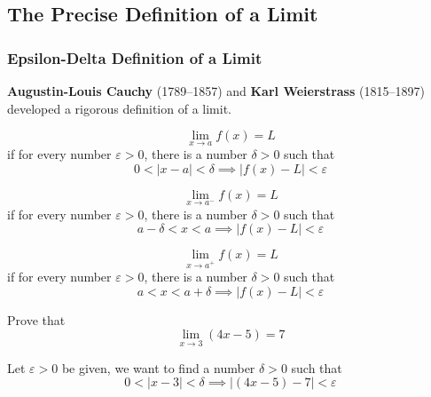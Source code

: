 \subsection{The Precise Definition of a Limit}

\subsubsection{Epsilon-Delta Definition of a Limit}
\textbf{Augustin-Louis Cauchy} (1789--1857) and \textbf{Karl Weierstrass}
(1815--1897) developed a rigorous definition of a limit.
\begin{definition}
    \[\lim_{x\to a}f(x)=L\] if for every number \(\varepsilon>0\), there is a
    number \(\delta>0\) such that \[0<|x-a|<\delta\implies|f(x)-L|<\varepsilon\]
\end{definition}
\begin{definition}
    \[\lim_{x\to a^-}f(x)=L\] if for every number \(\varepsilon>0\), there is a
    number \(\delta>0\) such that \[a-\delta<x<a\implies|f(x)-L|<\varepsilon\]
\end{definition}
\begin{definition}
    \[\lim_{x\to a^+}f(x)=L\] if for every number \(\varepsilon>0\), there is a
    number \(\delta>0\) such that \[a<x<a+\delta\implies|f(x)-L|<\varepsilon\]
\end{definition}
\begin{problem}
    Prove that \[\lim_{x\to 3}(4x-5)=7\]
\end{problem}
\begin{solution}
    Let \(\varepsilon>0\) be given, we want to find a number \(\delta>0\) such
    that \[0<|x-3|<\delta\implies|(4x-5)-7|<\varepsilon\]
\end{solution}
